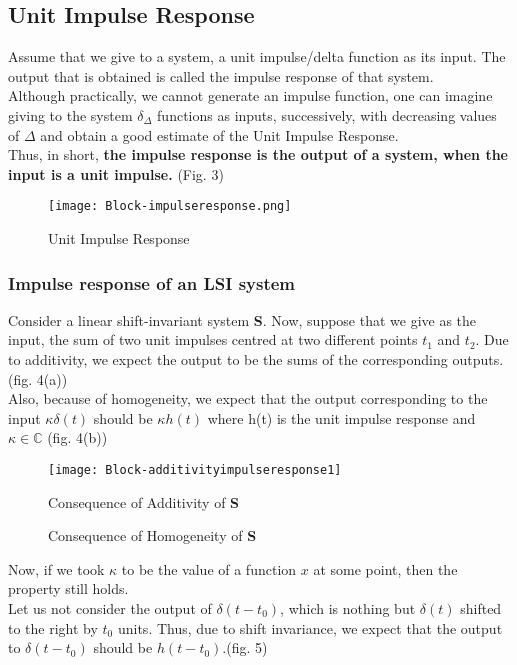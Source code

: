 \subsection{Unit Impulse Response}
Assume that we give to a system, a unit impulse/delta function as its input. The output that is obtained is called the impulse response of that system. \\
\indent Although practically, we cannot generate an impulse function, one can imagine giving to the system $\delta_\Delta$ functions as inputs, successively, with decreasing values of $\Delta$ and obtain a good estimate of the Unit Impulse Response.\\
\indent Thus, in short, \textbf{the impulse response is the output of a system, when the input is a unit impulse.} (Fig. 3)
\begin{figure}[H]
	\centering
	\texttt{[image: Block-impulseresponse.png]}
	\caption{Unit Impulse Response}
\end{figure}

\subsubsection{Impulse response of an LSI system}
Consider a linear shift-invariant system \textbf{S}. Now, suppose that we give as the input, the sum of two unit impulses centred at two different points $t_1$ and $t_2$. Due to additivity, we expect the output to be the sums of the corresponding outputs. (fig. 4(a))\\
\indent Also, because of homogeneity, we expect that the output corresponding to the input $\kappa\delta(t)$ should be $\kappa h(t)$ where h(t) is the unit impulse response and $\kappa\in\mathbb{C}$ (fig. 4(b))
\begin{figure}[H]
    \centering
    \texttt{[image: Block-additivityimpulseresponse1]}
    \caption{Consequence of Additivity of \textbf{S}}
\end{figure}
\begin{figure}[H]
	\centering
    
    \caption{Consequence of Homogeneity of \textbf{S}}
\end{figure}

Now, if we took $\kappa$ to be the value of a function $x$ at some point, then the property still holds.\\
\indent Let us not consider the output of $\delta(t-t_0)$, which is nothing but $\delta(t)$ shifted to the right by $t_0$ units. Thus, due to shift invariance, we expect that the output to $\delta(t-t_0)$ should be $h(t-t_0)$.(fig. 5)

